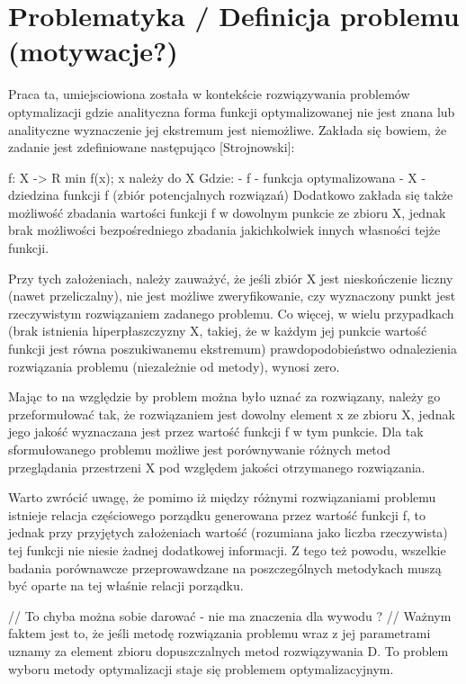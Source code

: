 \documentclass[11pt]{report}
\begin{document}
\section{Problematyka / Definicja problemu (motywacje?)} %
\par{
Praca ta, umiejsciowiona została w kontekście rozwiązywania problemów optymalizacji gdzie analityczna forma funkcji optymalizowanej nie jest znana lub analityczne wyznaczenie jej ekstremum jest niemożliwe. Zakłada się bowiem, że zadanie jest zdefiniowane następująco [Strojnowski]:
}
\par{
	f: X -> R
	min f(x); x należy do X
Gdzie: 
 	- f - funkcja optymalizowana
	- X - dziedzina funkcji f (zbiór potencjalnych rozwiązań)
Dodatkowo zakłada się także możliwość zbadania wartości funkcji f w dowolnym punkcie ze zbioru X, jednak brak możliwości bezpośredniego zbadania jakichkolwiek innych własności tejże funkcji.
}
\par{
Przy tych założeniach, należy zauważyć, że jeśli zbiór X jest nieskończenie liczny (nawet przeliczalny), nie jest możliwe zweryfikowanie, czy wyznaczony punkt jest rzeczywistym rozwiązaniem zadanego problemu. Co więcej, w wielu przypadkach (brak istnienia hiperpłaszczyzny X, takiej, że w każdym jej punkcie wartość funkcji jest równa poszukiwanemu ekstremum) prawdopodobieństwo odnalezienia rozwiązania problemu (niezależnie od metody), wynosi zero.
}
\par{
Mając to na względzie by problem można było uznać za rozwiązany, należy go przeformułować tak, że rozwiązaniem jest dowolny element x ze zbioru X, jednak jego jakość wyznaczana jest przez wartość funkcji f w tym punkcie. Dla tak sformułowanego problemu możliwe jest porównywanie różnych metod przeglądania przestrzeni X pod względem jakości otrzymanego rozwiązania.
}
\par{
Warto zwrócić uwagę, że pomimo iż między różnymi rozwiązaniami problemu istnieje relacja częściowego porządku generowana przez wartość funkcji f, to jednak przy przyjętych założeniach wartość (rozumiana jako liczba rzeczywista) tej funkcji nie niesie żadnej dodatkowej informacji. Z tego też powodu, wszelkie badania porównawcze przeprowawdzane na poszczególnych metodykach muszą być oparte na tej właśnie relacji porządku.
}
\par{
// To chyba można sobie darować - nie ma znaczenia dla wywodu ?
// Ważnym faktem jest to, że jeśli metodę rozwiązania problemu wraz z jej parametrami uznamy za element zbioru dopuszczalnych metod rozwiązywania D. To problem wyboru metody optymalizacji staje się problemem optymalizacyjnym.
}
\end{document}
